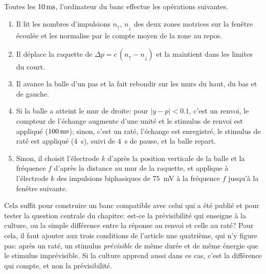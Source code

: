 Toutes les $10\,\text{ms}$, l'ordinateur du banc effectue les opérations suivantes.
\begin{enumerate}
\item Il lit les nombres d'impulsions $n_\uparrow$, $n_\downarrow$ des deux zones motrices sur la fenêtre écoulée et les normalise par le compte moyen de la zone au repos.
\item Il déplace la raquette de $\Delta p=c\,(n_\uparrow-n_\downarrow)$ et la maintient dans les limites du court.
\item Il avance la balle d'un pas et la fait rebondir sur les murs du haut, du bas et de gauche.
\item Si la balle a atteint le mur de droite: pour $|y-p|<0.1$, c'est un renvoi, le compteur de l'échange augmente d'une unité et le stimulus de renvoi est appliqué ($100\,\text{ms}$); sinon, c'est un raté, l'échange est enregistré, le stimulus de raté est appliqué ($4$~s), suivi de $4$~s de pause, et la balle repart.
\item Sinon, il choisit l'électrode $k$ d'après la position verticale de la balle et la fréquence $f$ d'après la distance au mur de la raquette, et applique à l'électrode $k$ des impulsions biphasiques de $75$~mV à la fréquence $f$ jusqu'à la fenêtre suivante.
\end{enumerate}
Cela suffit pour construire un banc compatible avec celui qui a été publié et pour tester la question centrale du chapitre: est-ce la prévisibilité qui enseigne à la culture, ou la simple différence entre la réponse au renvoi et celle au raté? Pour cela, il faut ajouter aux trois conditions de l'article une quatrième, qui n'y figure pas: après un raté, un stimulus \emph{prévisible} de même durée et de même énergie que le stimulus imprévisible. Si la culture apprend aussi dans ce cas, c'est la différence qui compte, et non la prévisibilité.
